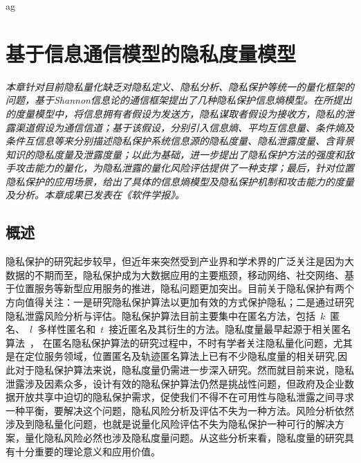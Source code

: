 ag\chapter{基于信息通信模型的隐私度量模型}
\label{chap:entropy-metric-model}

\textit{ }

\textit{本章针对目前隐私量化缺乏对隐私定义、隐私分析、隐私保护等统一的量化框架的问题，基于Shannon信息论的通信框架提出了几种隐私保护信息熵模型。在所提出的度量模型中，将信息拥有者假设为发送方，隐私谋取者假设为接收方，隐私的泄露渠道假设为通信信道；基于该假设，分别引入信息熵、平均互信息量、条件熵及条件互信息等来分别描述隐私保护系统信息源的隐私度量、隐私泄露度量、含背景知识的隐私度量及泄露度量；以此为基础，进一步提出了隐私保护方法的强度和敌手攻击能力的量化，为隐私泄露的量化风险评估提供了一种支撑；最后，针对位置隐私保护的应用场景，给出了具体的信息熵模型及隐私保护机制和攻击能力的度量及分析。本章成果已发表在《软件学报》。}

\section{概述}

隐私保护的研究起步较早，但近年来突然受到产业界和学术界的广泛关注是因为大数据的不期而至，隐私保护成为大数据应用的主要瓶颈，移动网络、社交网络、基于位置服务等新型应用服务的推进，隐私问题更加突出。目前关于隐私保护有两个方向值得关注：一是研究隐私保护算法以更加有效的方式保护隐私；二是通过研究隐私泄露风险分析与评估。隐私保护算法目前主要集中在匿名方法，包括~$k$~匿名、~$l$~多样性匿名和~$t$~接近匿名及其衍生的方法。隐私度量最早起源于相关匿名算法~\cite{sweeney2002k}， 在匿名隐私保护算法的研究过程中，不时有学者关注隐私量化问题，尤其是在定位服务领域，位置匿名及轨迹匿名算法上已有不少隐私度量的相关研究\cite{shokri2011quantifying,olteanu2017quantifying},因此对于隐私保护算法来说，隐私度量仍需进一步深入研究。然而就目前来说，隐私泄露涉及因素众多，设计有效的隐私保护算法仍然是挑战性问题，但政府及企业数据开放共享中迫切的隐私保护需求，促使我们不得不在可用性与隐私泄露之间寻求一种平衡，要解决这个问题，隐私风险分析及评估不失为一种方法。风险分析依然涉及到隐私量化问题，也就是说量化风险评估不失为隐私保护一种可行的解决方案，量化隐私风险必然也涉及隐私度量问题。从这些分析来看，隐私度量的研究具有十分重要的理论意义和应用价值。

